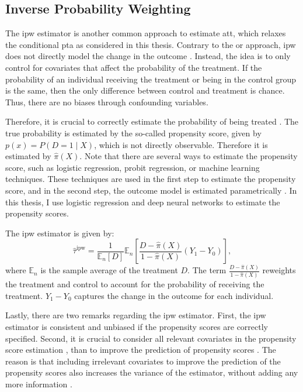 \subsection{Inverse Probability Weighting}
The \ac{ipw} estimator is another common approach to estimate \ac{att}, which relaxes the conditional \ac{pta} as considered in this thesis.
Contrary to the \ac{or} approach, \ac{ipw} does not directly model the change in the outcome \citep{santannaDoublyRobustDifferenceindifferences2020}.
Instead, the idea is to only control for covariates that affect the probability of the treatment.
If the probability of an individual receiving the treatment or being in the control group is the same, then the only difference between control and treatment is chance.
Thus, there are no biases through confounding variables.

Therefore, it is crucial to correctly estimate the probability of being treated \citep{angrist2009mostly}.
The true probability is estimated by the so-called propensity score, given by $p(x) = P(D=1 \mid X)$, which is not directly observable.
Therefore it is estimated by $\hat{\pi}(X)$.
Note that there are several ways to estimate the propensity score, such as logistic regression, probit regression, or machine learning techniques.
These techniques are used in the first step to estimate the propensity score, and in the second step, the outcome model is estimated parametrically \citep{abadieSemiparametricDifferenceinDifferencesEstimators2005}.
In this thesis, I use logistic regression and deep neural networks to estimate the propensity scores.

The \ac{ipw} estimator is given by:
\begin{equation}
\hat{\tau}^{\text{ipw}} = \frac{1}{\mathbb{E}_n[D]} \mathbb{E}_n \left[ \frac{D - \hat{\pi}(X)}{1 - \hat{\pi}(X)} (Y_1 - Y_0) \right],
\label{eq:4}
\end{equation}
where $\mathbb{E}_n$  is the sample average of the treatment $D$.
The term $\frac{D - \hat{\pi}(X)}{1 - \hat{\pi}(X)}$ reweights the treatment and control to account for the probability of receiving the treatment.
$Y_1 - Y_0$ captures the change in the outcome for each individual.

Lastly, there are two remarks regarding the \ac{ipw} estimator.
First, the \ac{ipw} estimator is consistent and unbiased if the propensity scores are correctly specified.
Second, it is crucial to consider all relevant covariates in the propensity score estimation \citep{angrist2009mostly}, than to improve the prediction of propensity scores \citep{https://doi.org/10.3982/ECTA18515}.
The reason is that including irrelevant covariates to improve the prediction of the propensity scores also increases the variance of the estimator, without adding any more information \citep{hernanCausalInferenceWhat}.

